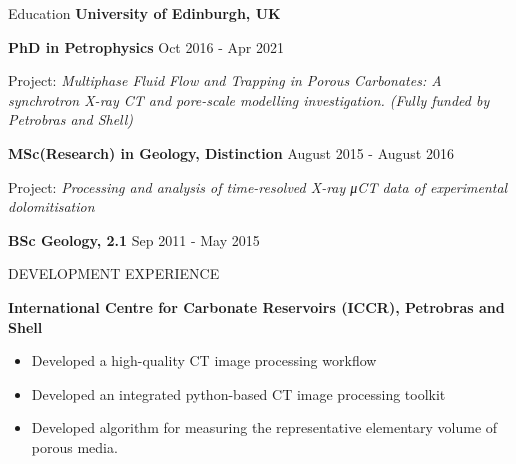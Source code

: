\documentclass{resume} %
\newenvironment{indentpar}[1]%
  {\begin{list}{}%
          {\setlength{\leftmargin}{#1}}%
          \item[]%
  }
  {\end{list}}
\begin{document}
\begin{rSection}{Education}
{\bf University of Edinburgh, UK} 
\begin{indentpar}{0.5cm}

\textbf{PhD in Petrophysics} \hfill {Oct 2016 - Apr 2021}
\begin{indentpar}{0.5cm}
Project: \textit{Multiphase Fluid Flow and Trapping in Porous Carbonates: A synchrotron X-ray CT and pore-scale modelling investigation. (Fully funded by Petrobras and Shell)}
\end{indentpar}
\textbf{MSc(Research) in Geology, Distinction} \hfill {August 2015 - August 2016} 
\begin{indentpar}{0.5cm}
Project: \textit {Processing and analysis of time-resolved X-ray μCT data of experimental dolomitisation}
\end{indentpar}
\textbf{    BSc Geology, 2.1}  \hfill {Sep 2011 - May 2015} 
\end{indentpar}
\end{rSection}
\begin{rSection}{DEVELOPMENT EXPERIENCE}
\begin{indentpar}{0.5cm}
\textbf{International Centre for Carbonate Reservoirs (ICCR), Petrobras and Shell} 
\begin{indentpar}{0.5cm}
\begin{itemize}   
    \item Developed a high-quality CT image processing workflow 
    \item Developed an integrated python-based CT image processing toolkit 
    \item Developed algorithm for measuring the representative elementary volume of porous media.
\end{itemize}
\end{indentpar}
\end{indentpar}
\end{rSection}

\end{document}
